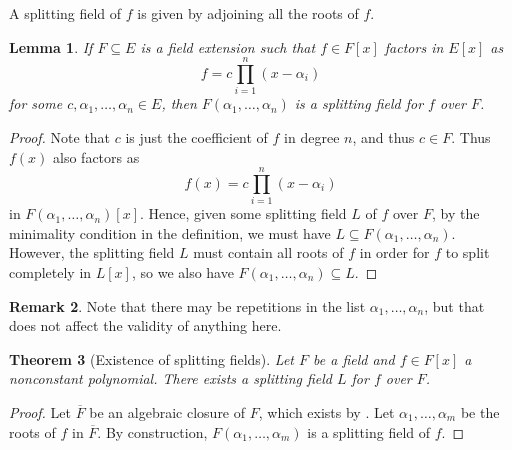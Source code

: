 \documentclass[12pt]{report}
\newtheorem{theorem}{Theorem}[chapter]
\newtheorem{lemma}[theorem]{Lemma}
\numberwithin{equation}{section}
\numberwithin{theorem}{chapter}
\theoremstyle{definition}
\newtheorem*{basic properties}{Basic Properties}
\newtheorem*{Important Remark}{Important Remark}
\newtheorem{remark}[theorem]{Remark}
\begin{document}
A splitting field of $f$ is given by adjoining all the roots of $f$.

\begin{lemma}\label{lemma splitting field}
If $F \subseteq E$ is a field extension such that $f \in F[x]$ factors in $E[x]$ as 
$$f = c\prod_{i=1}^n (x - \alpha_i)$$ 
for some $c,\alpha_1, \ldots, \alpha_n \in E$, then $F(\alpha_1,\ldots,\alpha_n)$ is a splitting field for $f$ over $F$. 
\end{lemma}

\begin{proof}
Note that $c$ is just the coefficient of $f$ in degree $n$, and thus $c \in F$. Thus $f(x)$ also factors as 
$$f(x) = c \prod_{i=1}^n (x - \alpha_i)$$ 
in $F(\alpha_1,\ldots,\alpha_n)[x]$. Hence, given some splitting field $L$ of $f$ over $F$, by the minimality condition in the definition, we must have $L \subseteq F(\alpha_1,\dots, \alpha_n)$. However, the splitting field $L$ must contain all roots of $f$ in order for $f$ to split completely in $L[x]$, so we also have $F(\alpha_1,\dots, \alpha_n) \subseteq L$.
\end{proof}


\begin{remark}
	Note that there may be repetitions in the list $\alpha_1,\ldots, \alpha_n$, but that does not affect the validity of anything here.
\end{remark}

%

\begin{theorem}[Existence of splitting fields]\label{existence of splitting fields}
Let $F$ be a field and $f \in F[x]$ a nonconstant polynomial. There exists a splitting field $L$ for $f$ over $F$.
\end{theorem}

\begin{proof} 
Let $\overline{F}$ be an algebraic closure of $F$, which exists by . Let $\alpha_1, \ldots, \alpha_m$ be the roots of $f$ in $\overline{F}$. By construction, $F(\alpha_1, \ldots, \alpha_m)$ is a splitting field of $f$.
\end{proof}
\end{document}
